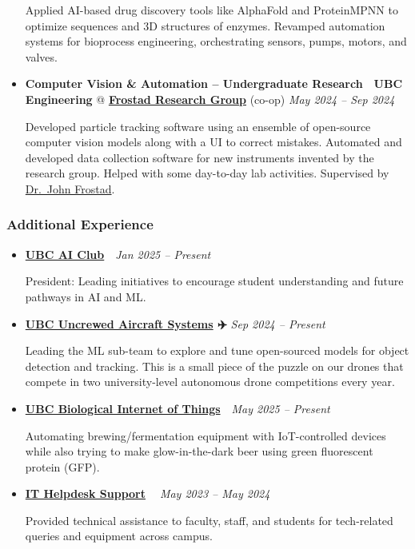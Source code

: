 \documentclass[
  11pt,
]{article}
\begin{document}
\begin{itemize}
  Applied AI-based drug discovery tools like AlphaFold and ProteinMPNN
  to optimize sequences and 3D structures of enzymes. Revamped
  automation systems for bioprocess engineering, orchestrating sensors,
  pumps, motors, and valves.
\item
  \textbf{Computer Vision \& Automation -- Undergraduate Research 🔬}
  \textbar{} \textbf{UBC Engineering} @
  \href{https://food.chbe.ubc.ca/}{\textbf{Frostad Research Group}}
  (co-op) \textbar{} \emph{May 2024 -- Sep 2024}

  Developed particle tracking software using an ensemble of open-source
  computer vision models along with a UI to correct mistakes. Automated
  and developed data collection software for new instruments invented by
  the research group. Helped with some day-to-day lab activities.
  Supervised by \href{https://chbe.ubc.ca/john-m-frostad/}{Dr.~John
  Frostad}.
\end{itemize}

\subsubsection{Additional Experience}\label{additional-experience}

\begin{itemize}
\item
  \textbf{\href{https://ubcaiclub.github.io/}{UBC AI Club} 🦾}
  \textbar{} \emph{Jan 2025 -- Present}

  President: Leading initiatives to encourage student understanding and
  future pathways in AI and ML.
\item
  \textbf{\href{https://ubcuas.com/}{UBC Uncrewed Aircraft Systems} ✈️}
  \textbar{} \emph{Sep 2024 -- Present}

  Leading the ML sub-team to explore and tune open-sourced models for
  object detection and tracking. This is a small piece of the puzzle on
  our drones that compete in two university-level autonomous drone
  competitions every year.
\item
  \textbf{\href{https://ubcbiot.com/}{UBC Biological Internet of Things}
  🧬} \textbar{} \emph{May 2025 -- Present}

  Automating brewing/fermentation equipment with IoT-controlled devices
  while also trying to make glow-in-the-dark beer using green
  fluorescent protein (GFP).
\item
  \textbf{\href{https://it.ubc.ca/}{IT Helpdesk Support} 👨‍💻} \textbar{}
  \emph{May 2023 -- May 2024}

  Provided technical assistance to faculty, staff, and students for
  tech-related queries and equipment across campus.
\end{itemize}
\end{document}

